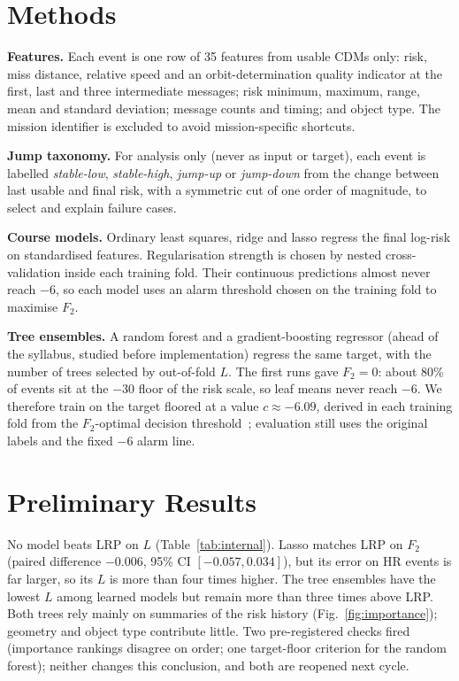 \documentclass[clean]{bam-proposal}
\begin{document}
\section{Methods}

\textbf{Features.} Each event is one row of 35 features from usable CDMs only: risk, miss distance, relative speed and an orbit-determination quality indicator at the first, last and three intermediate messages; risk minimum, maximum, range, mean and standard deviation; message counts and timing; and object type. The mission identifier is excluded to avoid mission-specific shortcuts.

\textbf{Jump taxonomy.} For analysis only (never as input or target), each event is labelled \emph{stable-low}, \emph{stable-high}, \emph{jump-up} or \emph{jump-down} from the change between last usable and final risk, with a symmetric cut of one order of magnitude, to select and explain failure cases.

\textbf{Course models.} Ordinary least squares, ridge and lasso regress the final log-risk on standardised features. Regularisation strength is chosen by nested cross-validation inside each training fold. Their continuous predictions almost never reach \(-6\), so each model uses an alarm threshold chosen on the training fold to maximise \(F_2\).

\textbf{Tree ensembles.} A random forest and a gradient-boosting regressor (ahead of the syllabus, studied before implementation) regress the same target, with the number of trees selected by out-of-fold \(L\). The first runs gave \(F_2=0\): about 80\% of events sit at the \(-30\) floor of the risk scale, so leaf means never reach \(-6\). We therefore train on the target floored at a value \(c\approx-6.09\), derived in each training fold from the \(F_2\)-optimal decision threshold~\citep{lipton2014optimal}; evaluation still uses the original labels and the fixed \(-6\) alarm line.

\section{Preliminary Results}

No model beats LRP on \(L\) (Table~\ref{tab:internal}). Lasso matches LRP on \(F_2\) (paired difference \(-0.006\), 95\% CI \([-0.057, 0.034]\)), but its error on HR events is far larger, so its \(L\) is more than four times higher. The tree ensembles have the lowest \(L\) among learned models but remain more than three times above LRP. Both trees rely mainly on summaries of the risk history (Fig.~\ref{fig:importance}); geometry and object type contribute little. Two pre-registered checks fired (importance rankings disagree on order; one target-floor criterion for the random forest); neither changes this conclusion, and both are reopened next cycle.
\end{document}
